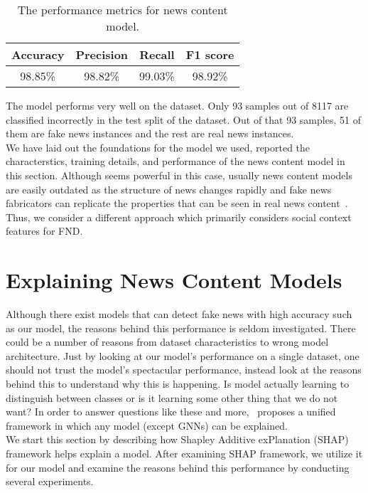 \begin{table}
    \centering
    \begin{tabular}{c | c | c | c}
        \textbf{Accuracy} & \textbf{Precision} & \textbf{Recall} & \textbf{F1 score} \\
        \hline
        98.85\%           & 98.82\%            & 99.03\%         & 98.92\%           \\
    \end{tabular}
    \caption[The performance metrics for news content model.]{The performance metrics for news content model.}
    \label{tab:newsContentModelPerformanceMetrics}
\end{table}
The model performs very well on the dataset. Only 93 samples out of 8117 are classified incorrectly in the test split of the dataset. Out of that 93 samples, 51 of them are fake news instances and the rest are real news instances. \\
We have laid out the foundations for the model we used, reported the characterstics, training details, and performance of the news content model in this section. Although seems powerful in this case, usually news content models are easily outdated as the structure of news changes rapidly and fake news fabricators can replicate the properties that can be seen in real news content~\parencite{HierarchicalPropagationNetworksForFND_Shu}. Thus, we consider a different approach which primarily considers social context features for FND.\\

\section{Explaining News Content Models}
\label{sec:ExplainingNewsContentModels}
Although there exist models that can detect fake news with high accuracy such as our model, the reasons behind
this performance is seldom investigated. There could be a number of reasons from dataset characteristics to wrong
model architecture. Just by looking at our model's performance on a single dataset, one should not trust the model's spectacular performance, instead look at the reasons behind this to understand why this is happening. Is model
actually learning to distinguish between classes or is it learning some other thing that we do not want? In order to
answer questions like these and more,~\cite{AUnifiedApproach_Lundberg} proposes a unified framework in which any model (except GNNs) can be explained.\\
We start this section by describing how Shapley Additive exPlanation (SHAP) framework helps explain a model. After examining SHAP framework, we utilize it for our model and examine the reasons behind this performance by conducting several experiments.\\
